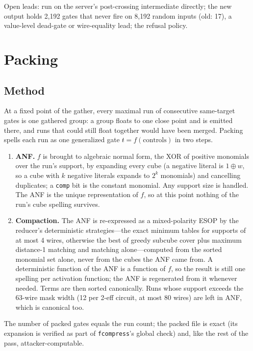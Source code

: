 \documentclass[11pt]{article}
\begin{document}
Open leads: run on the server's post-crossing intermediate directly; the new output holds
2,192 gates that never fire on 8,192 random inputs (old: 17), a value-level dead-gate or
wire-equality lead; the refusal policy.

\section{Packing}

\subsection{Method}

At a fixed point of the gather, every maximal run of consecutive same-target gates is one
gathered group: a group floats to one close point and is emitted there, and runs that could
still float together would have been merged. Packing spells each run as one generalized gate
$t \mathrel{\hat{}}= f(\text{controls})$ in two steps.
\begin{enumerate}
\item \textbf{ANF.} $f$ is brought to algebraic normal form, the XOR of positive monomials
over the run's support, by expanding every cube (a negative literal is $1\oplus w$, so a cube
with $k$ negative literals expands to $2^k$ monomials) and cancelling duplicates; a
\texttt{comp} bit is the constant monomial. Any support size is handled. The ANF is the unique
representation of $f$, so at this point nothing of the run's cube spelling survives.
\item \textbf{Compaction.} The ANF is re-expressed as a mixed-polarity ESOP by the reducer's
deterministic strategies---the exact minimum tables for supports of at most 4 wires,
otherwise the best of greedy subcube cover plus maximum distance-1 matching and matching
alone---computed from the sorted monomial set alone, never from the cubes the ANF came from.
A deterministic function of the ANF is a function of $f$, so the result is still one spelling
per activation function; the ANF is regenerated from it whenever needed. Terms are then sorted
canonically. Runs whose support exceeds the 63-wire mask width (12 per 2-eff circuit, at most
80 wires) are left in ANF, which is canonical too.
\end{enumerate}
The number of packed gates equals the run count; the packed file is exact (its expansion is
verified as part of \texttt{fcompress}'s global check) and, like the rest of the pass,
attacker-computable.
\end{document}
